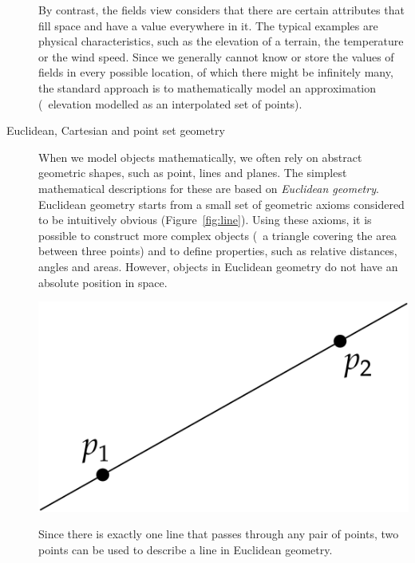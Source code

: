 \begin{description}
By contrast, the fields view considers that there are certain attributes that fill space and have a value everywhere in it.
The typical examples are physical characteristics, such as the elevation of a terrain, the temperature or the wind speed.
Since we generally cannot know or store the values of fields in every possible location, of which there might be infinitely many, the standard approach is to mathematically model an approximation (\eg\ elevation modelled as an interpolated set of points).


\item[Euclidean, Cartesian and point set geometry]
When we model objects mathematically, we often rely on abstract geometric shapes, such as point, lines and planes.
The simplest mathematical descriptions for these are based on \emph{Euclidean geometry}.
Euclidean geometry starts from a small set of geometric axioms considered to be intuitively obvious (Figure~\ref{fig:line}).
Using these axioms, it is possible to construct more complex objects (\eg\ a triangle covering the area between three points) and to define properties, such as relative distances, angles and areas.
However, objects in Euclidean geometry do not have an absolute position in space.

\begin{marginfigure}
\centering
\includegraphics[width=\linewidth]{figs/line.pdf}
\caption{Since there is exactly one line that passes through any pair of points, two points can be used to describe a line in Euclidean geometry.}%
\label{fig:line}
\end{marginfigure}


\end{description}
